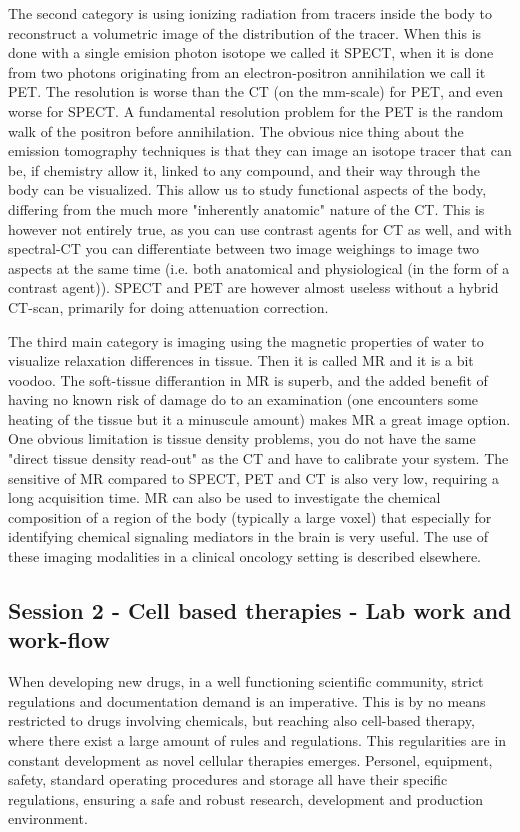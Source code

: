 \documentclass[12p]{article}
\begin{document}
The second category is using ionizing radiation from tracers inside the body to reconstruct a volumetric image of the distribution of the tracer.
When this is done with a single emision photon isotope we called it SPECT, when it is done from two photons originating from an electron-positron annihilation we call it PET.
The resolution is worse than the CT (on the mm-scale) for PET, and even worse for SPECT.
A fundamental resolution problem for the PET is the random walk of the positron before annihilation.
The obvious nice thing about the emission tomography techniques is that they can image an isotope tracer that can be, if chemistry allow it, linked to any compound, and their way through the body can be visualized.
This allow us to study functional aspects of the body, differing from the much more "inherently anatomic" nature of the CT.
This is however not entirely true, as you can use contrast agents for CT as well, and with spectral-CT you can differentiate between two image weighings to image two aspects at the same time (i.e. both anatomical and physiological (in the form of a contrast agent)).
SPECT and PET are however almost useless without a hybrid CT-scan, primarily for doing attenuation correction.

The third main category is imaging using the magnetic properties of water to visualize relaxation differences in tissue.
Then it is called MR and it is a bit voodoo. 
The soft-tissue differantion in MR is superb, and the added benefit of having no known risk of damage do to an examination (one encounters some heating of the tissue but it a minuscule amount) makes MR a great image option.
One obvious limitation is tissue density problems, you do not have the same "direct tissue density read-out" as the CT and have to calibrate your system.
The sensitive of MR compared to SPECT, PET and CT is also very low, requiring a long acquisition time.
MR can also be used to investigate the chemical composition of a region of the body (typically a large voxel) that especially for identifying chemical signaling mediators in the brain is very useful.
The use of these imaging modalities in a clinical oncology setting is described elsewhere.


\subsection*{Session 2 - Cell based therapies - Lab work and work-flow}

When developing new drugs, in a well functioning scientific community, strict regulations and documentation demand is an imperative.
This is by no means restricted to drugs involving chemicals, but reaching also cell-based therapy, where there exist a large amount of rules and regulations.
This regularities are in constant development as novel cellular therapies emerges.
Personel, equipment, safety, standard operating procedures and storage all have their specific regulations, ensuring a safe and robust research, development and production environment.
\end{document}
